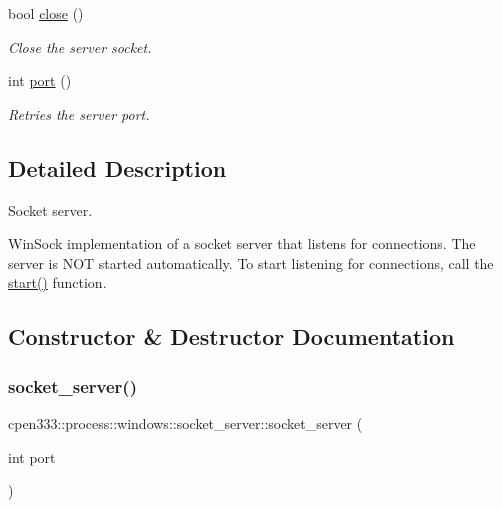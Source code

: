 \begin{DoxyCompactItemize}
bool \hyperlink{classcpen333_1_1process_1_1windows_1_1socket__server_a5eddf38d7b08e27f2299a750f16eae66}{close} ()
\begin{DoxyCompactList}\small\item\em Close the server socket. \end{DoxyCompactList}\item 
int \hyperlink{classcpen333_1_1process_1_1windows_1_1socket__server_a4b5f9231c046f947a77a6458202c2712}{port} ()
\begin{DoxyCompactList}\small\item\em Retries the server port. \end{DoxyCompactList}\end{DoxyCompactItemize}


\subsection{Detailed Description}
Socket server. 

Win\+Sock implementation of a socket server that listens for connections. The server is N\+OT started automatically. To start listening for connections, call the \hyperlink{classcpen333_1_1process_1_1windows_1_1socket__server_a0a2021766c8d5728d044a96d24bbc684}{start()} function. 

\subsection{Constructor \& Destructor Documentation}
\mbox{\label{classcpen333_1_1process_1_1windows_1_1socket__server_ada3d9f2a11e196dc91b3199b37fe50e2}} 
\subsubsection{\texorpdfstring{socket\+\_\+server()}{socket\_server()}}
{\footnotesize\ttfamily cpen333\+::process\+::windows\+::socket\+\_\+server\+::socket\+\_\+server (\begin{DoxyParamCaption}\item[{int}]{port }\end{DoxyParamCaption})\hspace{0.3cm}{\ttfamily [inline]}}



